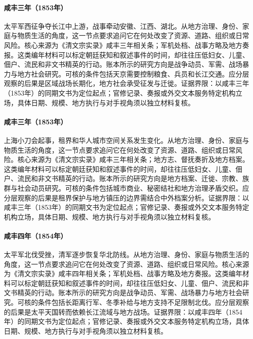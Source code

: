\hypertarget{social:EQ-1853-WESTERN-EXPEDITION}{}\paragraph{咸丰三年（1853年）}太平军西征争夺长江中上游，战事牵动安徽、江西、湖北。从地方治理、身份、家庭与物质生活的角度，这一节点要求追问它在何处改变了资源、道路、组织或日常风险。核心来源为《清文宗实录》咸丰三年相关条；军机处档、战事方略及地方奏报。这类编年材料可以标定朝廷获知和叙述事件的时间，却往往压低妇女、儿童、佃户、流民和非文书精英的行动。账本所示的研究方向是战争动员、军需、战场暴力与地方社会研究。可核的条件包括天京需要控制粮食、兵员和长江交通。应分层观察的后果是区域战场长期化，地方社会承受征发与迁徙。证据界限：以咸丰三年（1853年）的同期文书为定位起点；官修记录、奏报或外交文本服务特定机构立场，具体日期、规模、地方执行与对手视角须以独立材料复核。
\hypertarget{social:EQ-1853-SMALL-SWORDS-SHANGHAI}{}\paragraph{咸丰三年（1853年）}上海小刀会起事，租界和华人城市空间关系发生变化。从地方治理、身份、家庭与物质生活的角度，这一节点要求追问它在何处改变了资源、道路、组织或日常风险。核心来源为《清文宗实录》咸丰三年相关条；地方志、督抚奏折及地方档案。这类编年材料可以标定朝廷获知和叙述事件的时间，却往往压低妇女、儿童、佃户、流民和非文书精英的行动。账本所示的研究方向是地方档案、迁徙、宗教、族群与社会动员研究。可核的条件包括城市商业、秘密结社和地方治理矛盾交织。应分层观察的后果是租界保护与地方镇压的边界需结合中外档案分析。证据界限：以咸丰三年（1853年）的同期文书为定位起点；官修记录、奏报或外交文本服务特定机构立场，具体日期、规模、地方执行与对手视角须以独立材料复核。
\hypertarget{social:EQ-1854-TAIPING-NORTHERN-DEFEAT}{}\paragraph{咸丰四年（1854年）}太平军北伐受挫，清军逐步恢复华北防线。从地方治理、身份、家庭与物质生活的角度，这一节点要求追问它在何处改变了资源、道路、组织或日常风险。核心来源为《清文宗实录》咸丰四年相关条；军机处档、战事方略及地方奏报。这类编年材料可以标定朝廷获知和叙述事件的时间，却往往压低妇女、儿童、佃户、流民和非文书精英的行动。账本所示的研究方向是战争动员、军需、战场暴力与地方社会研究。可核的条件包括长距离行军、冬季补给与地方支持不足限制北伐。应分层观察的后果是太平天国转而依赖长江流域与地方战场。证据界限：以咸丰四年（1854年）的同期文书为定位起点；官修记录、奏报或外交文本服务特定机构立场，具体日期、规模、地方执行与对手视角须以独立材料复核。
